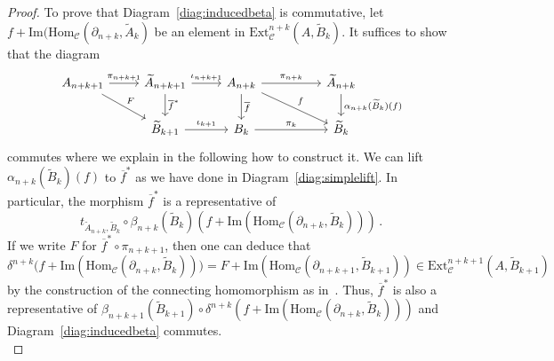 \documentclass[12pt,a4paper]{article}
\numberwithin{equation}{section}
\theoremstyle{nonumberplain}
\newtheorem{proof}{Proof}
\begin{document}
\begin{proof}
To prove that Diagram~\ref{diag:inducedbeta} is commutative, let $f + \mathrm{Im}(\mathrm{Hom}_{\mathcal{C}}(\partial_{n+k}, \widetilde{A}_k)$ be an element in $\mathrm{Ext}_{\mathcal{C}}^{n+k}(A, \widetilde{B}_k)$. It suffices to show that the diagram
\begin{equation}\label{diag:mislinbenson}
\begin{tikzcd}
  A_{n+k+1} \arrow[r, "\pi_{n+k+1}"] \arrow[rd, "F"]
    &\widetilde{A}_{n+k+1} \arrow[r, "\iota_{n+k+1}"] \arrow[d, "\overline{f}^{\ast}"]
    &A_{n+k} \arrow[rr, "\pi_{n+k}"] \arrow[rrd, "f"] \arrow[d, "\overline{f}"]
    & &\widetilde{A}_{n+k} \arrow[d, "\alpha_{n+k}(\widetilde{B}_k)(f)"] \\
  {}
    &\widetilde{B}_{k+1} \arrow[r, "\iota_{k+1}"]
    &B_k \arrow[rr, "\pi_k"]
    & &\widetilde{B}_k
\end{tikzcd}
\end{equation}
commutes where we explain in the following how to construct it. We can lift $\alpha_{n+k}(\widetilde{B}_k)(f)$ to $\overline{f}^{\ast}$ as we have done in Diagram~\ref{diag:simplelift}. In particular, the morphism $\overline{f}^{\ast}$ is a representative of
\[ t_{\widetilde{A}_{n+k}, \widetilde{B}_k} \circ \beta_{n+k}(\widetilde{B}_k)(f + \mathrm{Im}(\mathrm{Hom}_{\mathcal{C}}(\partial_{n+k}, \widetilde{B}_k))) \, . \]
If we write $F$ for $\overline{f}^{\ast} \circ \pi_{n+k+1}$, then one can deduce that
\[ \delta^{n+k} \big(f + \mathrm{Im}(\mathrm{Hom}_{\mathcal{C}}(\partial_{n+k}, \widetilde{B}_k)) \big) = F + \mathrm{Im}(\mathrm{Hom}_{\mathcal{C}}(\partial_{n+k+1}, \widetilde{B}_{k+1})) \in \mathrm{Ext}_{\mathcal{C}}^{n+k+1}(A, \widetilde{B}_{k+1}) \]
by the construction of the connecting homomorphism as in~\cite[pp.~11--12]{wei94}. Thus, $\overline{f}^{\ast}$ is also a representative of $\beta_{n+k+1}(\widetilde{B}_{k+1}) \circ \delta^{n+k}(f + \mathrm{Im}(\mathrm{Hom}_{\mathcal{C}}(\partial_{n+k}, \widetilde{B}_k)))$ and Diagram~\ref{diag:inducedbeta} commutes. \\


\end{proof}
\end{document}
